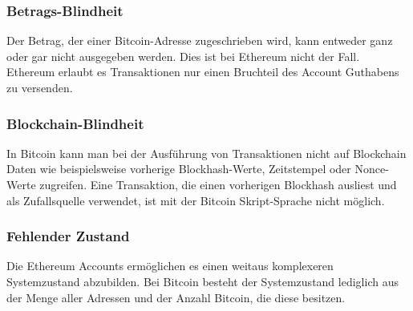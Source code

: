 \subsubsection{Betrags-Blindheit}
Der Betrag, der einer Bitcoin-Adresse zugeschrieben wird, kann entweder ganz oder gar nicht ausgegeben werden. Dies ist bei Ethereum nicht der Fall. Ethereum erlaubt es Transaktionen nur einen Bruchteil des Account Guthabens zu versenden.
\subsubsection{Blockchain-Blindheit}
In Bitcoin kann man bei der Ausführung von Transaktionen nicht auf Blockchain Daten wie beispielsweise vorherige Blockhash-Werte, Zeitstempel oder Nonce-Werte zugreifen. Eine Transaktion, die einen vorherigen Blockhash ausliest und als Zufallsquelle verwendet, ist mit der Bitcoin Skript-Sprache nicht möglich.
\subsubsection{Fehlender Zustand}
Die Ethereum Accounts ermöglichen es einen weitaus komplexeren Systemzustand abzubilden. Bei Bitcoin besteht der Systemzustand lediglich aus der Menge aller Adressen und der Anzahl Bitcoin, die diese besitzen.